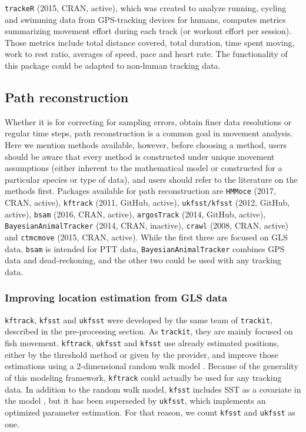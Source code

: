 \documentclass[a4paper,12pt]{article}
\newcommand{\Rpkg}[1]{\texttt{#1}}
\begin{document}
\Rpkg{trackeR} (2015, CRAN, active), which was created to analyze running, cycling and swimming data from GPS-tracking devices for humans, computes metrics summarizing movement effort during each track (or workout effort per session). Those metrics include total distance covered, total duration, time spent moving, work to rest ratio, averages of speed, pace and heart rate. The functionality of this package could be adapted to non-human tracking data.


\subsection*{Path reconstruction}

Whether it is for correcting for sampling errors, obtain finer data resolutions or regular time steps, path reconstruction is a common goal in movement analysis. Here we mention methods available, however, before choosing a method, users should be aware that every method is constructed under unique movement assumptions (either inherent to the mathematical model or constructed for a particular species or type of data), and users should refer to the literature on the methods first. Packages available for path reconstruction are \Rpkg{HMMoce} (2017, CRAN, active), \Rpkg{kftrack} (2011, GitHub, active), \Rpkg{ukfsst/kfsst} (2012, GitHub, active), \Rpkg{bsam} (2016, CRAN, active), \Rpkg{argosTrack} (2014, GitHub, active), \Rpkg{BayesianAnimalTracker} (2014, CRAN, inactive), \Rpkg{crawl} (2008, CRAN, active) and \Rpkg{ctmcmove} (2015, CRAN, active). While the first three are focused on GLS data, \Rpkg{bsam} is intended for PTT data, \Rpkg{BayesianAnimalTracker} combines GPS data and dead-reckoning, and the other two could be used with any tracking data.

\subsubsection*{Improving location estimation from GLS data}

\Rpkg{kftrack}, \Rpkg{kfsst} and \Rpkg{ukfsst} were developed by the same team of \Rpkg{trackit}, described in the pre-processing section. As \Rpkg{trackit}, they are mainly focused on fish movement. \Rpkg{kftrack}, \Rpkg{ukfsst} and \Rpkg{kfsst} use already estimated positions, either by the threshold method or given by the provider, and improve those estimations using a 2-dimensional random walk model \citep{Sibert2003}. Because of the generality of this modeling framework, \Rpkg{kftrack} could actually be used for any tracking data. In addition to the random walk model, \Rpkg{kfsst} includes SST as a covariate in the model \citep{Nielsen2006}, but it has been superseded by \Rpkg{ukfsst}, which implements an optimized parameter estimation. For that reason, we count \Rpkg{kfsst} and \Rpkg{ukfsst} as one.
\end{document}
